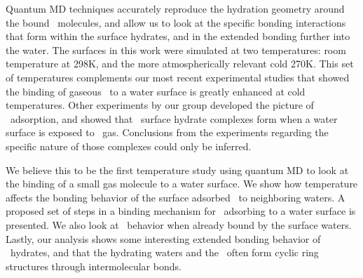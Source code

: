 Quantum MD techniques accurately reproduce the hydration geometry around the bound \suldiox~molecules, and allow us to look at the specific bonding interactions that form within the surface hydrates, and in the extended bonding further into the water. The surfaces in this work were simulated at two temperatures: room temperature at 298K, and the more atmospherically relevant cold 270K. This set of temperatures complements our most recent experimental studies that showed the binding of gaseous \suldiox~to a water surface is greatly enhanced at cold temperatures.\cite{Ota2011} Other experiments by our group developed the picture of \suldiox~adsorption, and showed that \suldiox~surface hydrate complexes form when a water surface is exposed to \suldiox~gas.\cite{Tarbuck2005,Tarbuck2006} Conclusions from the experiments regarding the specific nature of those complexes could only be inferred. 

We believe this to be the first temperature study using quantum MD to look at the binding of a small gas molecule to a water surface. We show how temperature affects the bonding behavior of the surface adsorbed \suldiox~to neighboring waters. A proposed set of steps in a binding mechanism for \suldiox~adsorbing to a water surface is presented. We also look at \suldiox~behavior when already bound by the surface waters. Lastly, our analysis shows some interesting extended bonding behavior of \suldiox~hydrates, and that the hydrating waters and the \suldiox~often form cyclic ring structures through intermolecular bonds.
